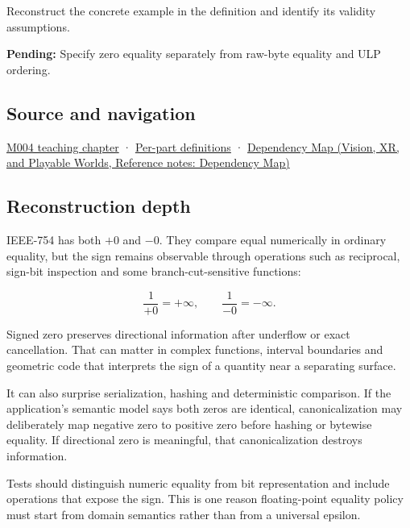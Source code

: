 Reconstruct the concrete example in the definition and identify its validity assumptions.

\textbf{Pending:} Specify zero equality separately from raw-byte equality and ULP ordering.

\subsection{Source and navigation}\label{appendix-3a048f032c1f-source-and-navigation}

\hyperref[01-foundations-i-ch001-a-stretching-ruler-for-real-valued-quantities]{M004 teaching chapter} · \hyperref[appendix-fd090d982a15-m004---parts-61-76]{Per-part definitions} · \href{../07-Vision-XR-and-Playable-Worlds/main.pdf\#nameddest=appendix-4ad47bdd269a}{Dependency Map (Vision, XR, and Playable Worlds, Reference notes: Dependency Map)}

\subsection{Reconstruction depth}\label{appendix-3a048f032c1f-reconstruction-depth}

IEEE-754 has both \(+0\) and \(-0\). They compare equal numerically in ordinary equality, but the sign remains observable through operations such as reciprocal, sign-bit inspection and some branch-cut-sensitive functions:

\[
\frac{1}{+0}=+\infty,
\qquad
\frac{1}{-0}=-\infty.
\]

Signed zero preserves directional information after underflow or exact cancellation. That can matter in complex functions, interval boundaries and geometric code that interprets the sign of a quantity near a separating surface.

It can also surprise serialization, hashing and deterministic comparison. If the application's semantic model says both zeros are identical, canonicalization may deliberately map negative zero to positive zero before hashing or bytewise equality. If directional zero is meaningful, that canonicalization destroys information.

Tests should distinguish numeric equality from bit representation and include operations that expose the sign. This is one reason floating-point equality policy must start from domain semantics rather than from a universal epsilon.
